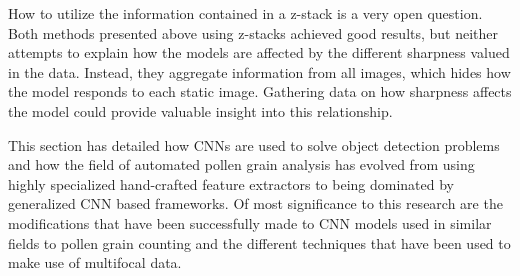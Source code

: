 How to utilize the information contained in a z-stack is a very open question.
Both methods presented above using z-stacks achieved good results, but neither attempts to explain how the models are affected by the different sharpness valued in the data.
Instead, they aggregate information from all images, which hides how the model responds to each static image.
Gathering data on how sharpness affects the model could provide valuable insight into this relationship.

This section has detailed how CNNs are used to solve object detection problems and how the field of automated pollen grain analysis has evolved from using highly specialized hand-crafted feature extractors to being dominated by generalized CNN based frameworks.
Of most significance to this research are the modifications that have been successfully made to CNN models used in similar fields to pollen grain counting and the different techniques that have been used to make use of multifocal data.
